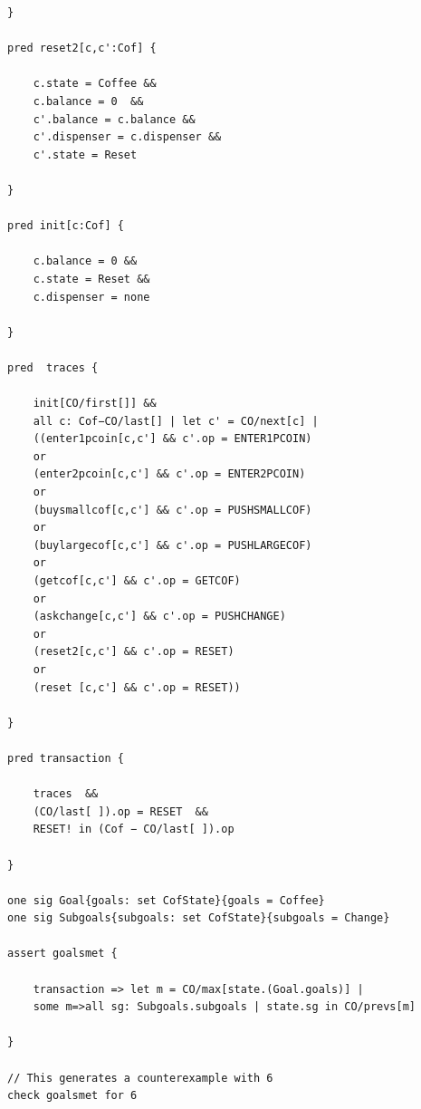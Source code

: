 \documentclass[a4paper,12pt]{report}
\begin{document}
\begin{verbatim}
}

pred reset2[c,c':Cof] {

	c.state = Coffee &&
	c.balance = 0  &&
	c'.balance = c.balance &&
	c'.dispenser = c.dispenser &&
	c'.state = Reset

}

pred init[c:Cof] {

	c.balance = 0 &&
	c.state = Reset &&
	c.dispenser = none

}

pred  traces {

	init[CO/first[]] &&
	all c: Cof−CO/last[] | let c' = CO/next[c] |
	((enter1pcoin[c,c'] && c'.op = ENTER1PCOIN)
	or
	(enter2pcoin[c,c'] && c'.op = ENTER2PCOIN)
	or
	(buysmallcof[c,c'] && c'.op = PUSHSMALLCOF)
	or
	(buylargecof[c,c'] && c'.op = PUSHLARGECOF)
	or
	(getcof[c,c'] && c'.op = GETCOF)
	or
	(askchange[c,c'] && c'.op = PUSHCHANGE)
	or
	(reset2[c,c'] && c'.op = RESET)
	or
	(reset [c,c'] && c'.op = RESET))

}

pred transaction {

	traces  &&
	(CO/last[ ]).op = RESET  &&
	RESET! in (Cof − CO/last[ ]).op

}

one sig Goal{goals: set CofState}{goals = Coffee}
one sig Subgoals{subgoals: set CofState}{subgoals = Change}

assert goalsmet {

	transaction => let m = CO/max[state.(Goal.goals)] |
	some m=>all sg: Subgoals.subgoals | state.sg in CO/prevs[m]
	
}

// This generates a counterexample with 6
check goalsmet for 6

\end{verbatim}
\end{document}

